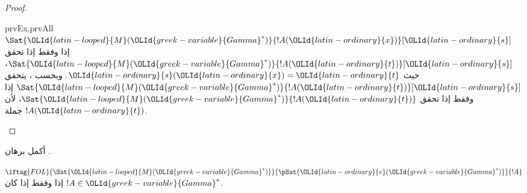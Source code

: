 \documentclass[../../../include/open-logic-section]{subfiles}
\begin{document}
{\begin{proof}
\begin{tagenumerate}{prvEx,prvAll}
{{    $\Sat{{\OLId{latin-looped}{M}}({\OLId{greek-variable}{Gamma}}^*)}{!A({\OLId{latin-ordinary}{x}})}[{\OLId{latin-ordinary}{s}}]$ إذا وفقط إذا تحقق
    $\Sat{{\OLId{latin-looped}{M}}({\OLId{greek-variable}{Gamma}}^*)}{!A({\OLId{latin-ordinary}{t}})}[{\OLId{latin-ordinary}{s}}]$، حيث ${\OLId{latin-ordinary}{s}}({\OLId{latin-ordinary}{x}}) = {\OLId{latin-ordinary}{t}}$. وبحسب
    ، يتحقق
    $\Sat{{\OLId{latin-looped}{M}}({\OLId{greek-variable}{Gamma}}^*)}{!A({\OLId{latin-ordinary}{t}})}[{\OLId{latin-ordinary}{s}}]$ إذا وفقط إذا تحقق
    $\Sat{{\OLId{latin-looped}{M}}({\OLId{greek-variable}{Gamma}}^*)}{!A({\OLId{latin-ordinary}{t}})}$، لأن $!A({\OLId{latin-ordinary}{t}})$ جملة.}}{}
\end{tagenumerate}
\end{proof}
}{}

\begin{prob}
أكمل برهان .
\end{prob}
\tagendprob

\begin{lem}[لمّة الصدق]
 
$\iftag{FOL}{\Sat{{\OLId{latin-looped}{M}}({\OLId{greek-variable}{Gamma}}^*)}}{\pSat{{\OLId{latin-ordinary}{v}}({\OLId{greek-variable}{Gamma}}^*)}}{!A}$ إذا وفقط إذا
كان $!A \in {\OLId{greek-variable}{Gamma}}^*$.
\end{lem}
\end{document}
